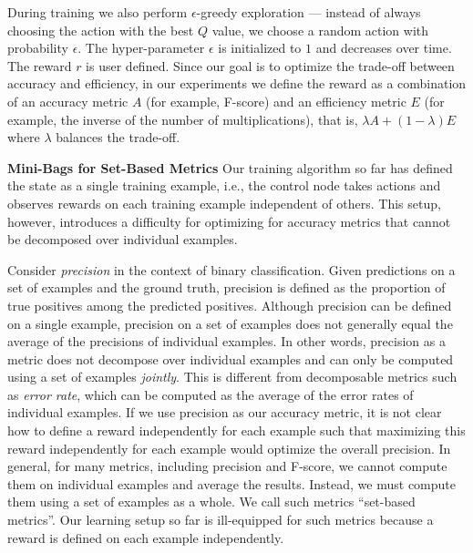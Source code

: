 \documentclass[10pt,twocolumn,letterpaper]{article}
\newcommand{\smallparagraph}[1]{\smallskip \noindent \textbf{#1}}
\begin{document}
During training we also perform $\epsilon$-greedy exploration --- instead of always
choosing the action with the best $Q$ value, we choose a random action with probability
$\epsilon$. The hyper-parameter $\epsilon$ is initialized to $1$ and decreases over time. 
The reward $r$ is user defined. Since our goal is to optimize the trade-off between accuracy and
efficiency, in our experiments we define the reward as a combination of an accuracy metric $A$
(for example, F-score) 
and an efficiency metric $E$ (for example, the inverse of the number of multiplications),
that is, $\lambda A + (1-\lambda) E$ where $\lambda$ balances the trade-off. 

\smallparagraph{Mini-Bags for Set-Based Metrics}
Our training algorithm so far has defined the state as a single training example, 
i.e., the control node takes actions and observes rewards on each training example
independent of others. This setup, however, introduces a difficulty for optimizing for accuracy
metrics that cannot be decomposed over individual examples. 

Consider \emph{precision} in the context of binary classification. Given predictions on a
set of examples and the ground truth, precision is defined as the proportion of true
positives among the predicted positives. Although precision can be defined on a single
example, precision on a set of examples does not generally equal the average of
the precisions of individual examples. In other words, precision as a metric does not decompose
over individual examples and can only be computed using a set of examples \emph{jointly}. This is different from decomposable metrics such as
\emph{error rate}, which can be computed as the average of the error
rates of individual examples. If we use
precision as our accuracy metric, it is not clear how to define a reward independently for each
example such that maximizing this reward independently for
each example would optimize the overall precision.  
In general, for many metrics, including precision and F-score, we
cannot compute them on individual examples and average the results. Instead, we must
compute them using a set of examples as a whole.  We call such metrics
``set-based metrics''. Our learning setup so far is ill-equipped for such metrics because
a reward is defined on each example independently. 
\end{document}
